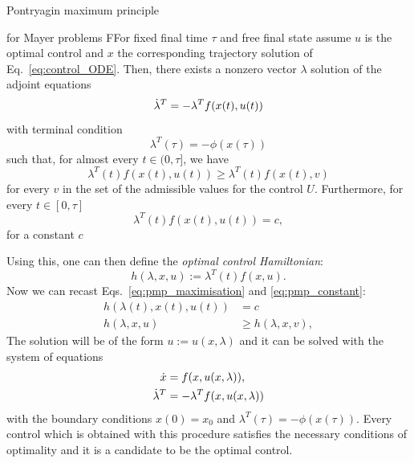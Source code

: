 \begin{mycolorbox}{Pontryagin maximum principle}
    \begin{theo}{{ for Mayer problems}}
        FFor fixed final time $\tau$ and free final state assume $u$ is the optimal control and $x$ the corresponding trajectory solution of Eq.~\eqref{eq:control_ODE}. Then, there exists a nonzero vector $\lambda$ solution of the adjoint equations
      \begin{equation}
          \dot{\lambda}^T = - \lambda^T f(x(t), u(t))
      \end{equation}
      with terminal condition
      \begin{equation}
          \lambda^T(\tau) = -\phi(x(\tau))
      \end{equation}
      such that, for almost every $t \in (0, \tau]$, we have
      \begin{equation}\label{eq:pmp_maximisation}
          \lambda^T(t) f(x(t), u(t)) \geq \lambda^T(t) f(x(t), v)
      \end{equation}
      for every $v$ in the set of the admissible values for the control $U$. Furthermore, for every $t \in [0, \tau]$
      \begin{equation}\label{eq:pmp_constant}
          \lambda^T(t) f(x(t), u(t)) = c,
      \end{equation}
      for a constant $c$
    \end{theo}
    Using this, one can then define the \emph{optimal control Hamiltonian}:
    \begin{equation}
        h(\lambda, x, u) := \lambda^T(t) f(x, u).
    \end{equation}
    Now we can recast Eqs.~\eqref{eq:pmp_maximisation} and \eqref{eq:pmp_constant}:
    \begin{equation}
        \begin{aligned}
            h(\lambda(t), x(t), u(t)) &= c \\
            h(\lambda, x, u) &\geq h(\lambda, x, v),
        \end{aligned}
    \end{equation}
    The solution will be of the form $u := u(x, \lambda)$ and it can be solved with the system of equations
    \begin{equation}
        \begin{aligned}
            \dot{x} &= f(x, u(x, \lambda)), \\
            \dot{\lambda}^T &= -\lambda^T f(x, u(x, \lambda))
        \end{aligned}
    \end{equation}
    with the boundary conditions $x(0) = x_0$ and $\lambda^T(\tau) = -\phi(x(\tau))$. Every control which is obtained with this procedure satisfies the necessary conditions of optimality and it is a candidate to be the optimal control.
\end{mycolorbox}

